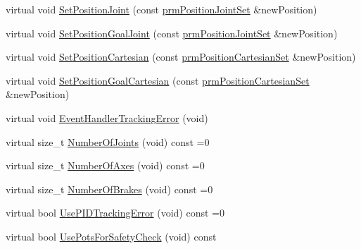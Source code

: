 \begin{DoxyCompactItemize}
\item 
virtual void \hyperlink{classmts_intuitive_research_kit_arm_aa79244fc49963ac5a86e33515d6f7a28}{Set\+Position\+Joint} (const \hyperlink{classprm_position_joint_set}{prm\+Position\+Joint\+Set} \&new\+Position)
\item 
virtual void \hyperlink{classmts_intuitive_research_kit_arm_ac15b7d7a8f9158e1375313dc7a816870}{Set\+Position\+Goal\+Joint} (const \hyperlink{classprm_position_joint_set}{prm\+Position\+Joint\+Set} \&new\+Position)
\item 
virtual void \hyperlink{classmts_intuitive_research_kit_arm_aa9bc859d4db6717fc7de986c62cb59d4}{Set\+Position\+Cartesian} (const \hyperlink{classprm_position_cartesian_set}{prm\+Position\+Cartesian\+Set} \&new\+Position)
\item 
virtual void \hyperlink{classmts_intuitive_research_kit_arm_af14cd392084eb47326b0a3afee59ee9a}{Set\+Position\+Goal\+Cartesian} (const \hyperlink{classprm_position_cartesian_set}{prm\+Position\+Cartesian\+Set} \&new\+Position)
\item 
virtual void \hyperlink{classmts_intuitive_research_kit_arm_acef3a97b491c995531899cdf45559c4f}{Event\+Handler\+Tracking\+Error} (void)
\item 
virtual size\+\_\+t \hyperlink{classmts_intuitive_research_kit_arm_a28cd357b9b185b2611348f770e9226c1}{Number\+Of\+Joints} (void) const =0
\item 
virtual size\+\_\+t \hyperlink{classmts_intuitive_research_kit_arm_ac4e94a3b87e5995946667faeaac171df}{Number\+Of\+Axes} (void) const =0
\item 
virtual size\+\_\+t \hyperlink{classmts_intuitive_research_kit_arm_af5aeb301791a6d88509deb924d63c37d}{Number\+Of\+Brakes} (void) const =0
\item 
virtual bool \hyperlink{classmts_intuitive_research_kit_arm_ac070e316cba6d7bfedc2ac1b461b7aa7}{Use\+P\+I\+D\+Tracking\+Error} (void) const =0
\item 
virtual bool \hyperlink{classmts_intuitive_research_kit_arm_a066ec46121a6a571b1ed3a851774a069}{Use\+Pots\+For\+Safety\+Check} (void) const 
\end{DoxyCompactItemize}
